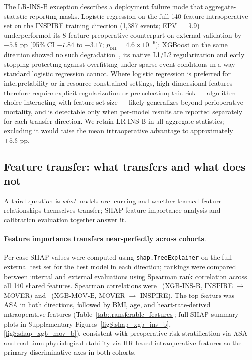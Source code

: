 The LR-INS-B exception describes a deployment failure mode that aggregate-statistic reporting masks. Logistic regression on the full 140-feature intraoperative set on the INSPIRE training direction (1{,}387 events; EPV $= 9.9$) underperformed its 8-feature preoperative counterpart on external validation by $-5.5$ pp (95\% CI $-7.84$ to $-3.17$; $p_{\text{BH}} = 4.6 \times 10^{-6}$); XGBoost on the same direction showed no such degradation~\cite{Riley2019b}, its native L1/L2 regularization and early stopping protecting against overfitting under sparse-event conditions in a way standard logistic regression cannot. Where logistic regression is preferred for interpretability or in resource-constrained settings, high-dimensional features therefore require explicit regularization or pre-selection; this risk --- algorithm choice interacting with feature-set size --- likely generalizes beyond perioperative mortality, and is detectable only when per-model results are reported separately for each transfer direction. We retain LR-INS-B in all aggregate statistics; excluding it would raise the mean intraoperative advantage to approximately $+5.8$ pp.

\subsection{Feature transfer: what transfers and what does not}
\label{sec:results:transfer}

A third question is \emph{what} models are learning and whether learned feature relationships themselves transfer; SHAP feature-importance analysis and calibration evaluation together answer it.

\paragraph{Feature importance transfers near-perfectly across cohorts.} Per-case SHAP values were computed using \texttt{shap.TreeExplainer} on the full external test set for the best model in each direction; rankings were compared between internal and external evaluations using Spearman rank correlation across all 140 shared features. Spearman correlations were \pnShapSpearmanRhoXgbInsBFull\ (XGB-INS-B, INSPIRE $\to$ MOVER) and \pnShapSpearmanRhoXgbMovBFull\ (XGB-MOV-B, MOVER $\to$ INSPIRE). The top feature was ASA in both directions, followed by BMI, age, and heart-rate-derived intraoperative features (Table~\ref{tab:transferable_features}; full SHAP summary plots in Supplementary Figures~\ref{figS:shap_xgb_ins_b}, \ref{figS:shap_xgb_mov_b}), consistent with preoperative risk stratification via ASA and real-time physiological stability via HR-based intraoperative features as the primary discriminative axes in both cohorts.

